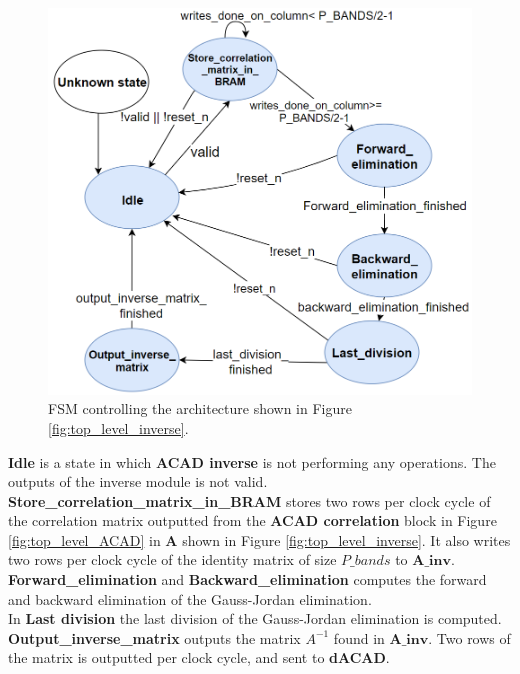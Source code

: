 \begin{figure}[H]
\centering
   \includegraphics[scale=0.3]{images/inverse_hw/fsm_inverse_matrix.PNG}
  \caption{FSM controlling the architecture shown in Figure \ref{fig:top_level_inverse}.  } 
  \label{fig:fsm_inverse_matrix}
\end{figure}


\textbf{Idle} is a state in which \textbf{ACAD inverse} is not performing any operations. The outputs of the inverse module is not valid. \\

\textbf{Store\_correlation\_matrix\_in\_BRAM} stores two rows per clock cycle of the correlation matrix outputted from the \textbf{ACAD correlation} block in Figure \ref{fig:top_level_ACAD} in  \textbf{A} shown in Figure \ref{fig:top_level_inverse}. It also writes two rows per clock cycle of the identity matrix of size $P\_bands$ to $\textbf{A\_inv}$. \\

\textbf{Forward\_elimination} and \textbf{Backward\_elimination} computes the forward and backward elimination
of the Gauss-Jordan elimination.\\

In \textbf{Last division} the last division of the Gauss-Jordan elimination is computed.\\

\textbf{Output\_inverse\_matrix} outputs the matrix $A^{-1}$ found in $\textbf{A\_inv}$. Two rows of the matrix is outputted per clock cycle, and sent to \textbf{dACAD}. 



